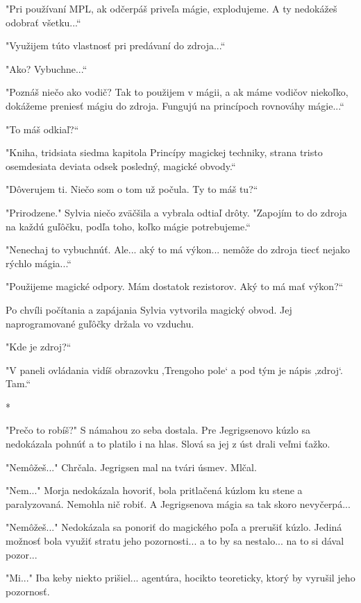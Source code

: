 \documentclass{book}
\begin{document}
"$ $Pri používaní MPL, ak odčerpáš priveľa mágie, explodujeme. A ty nedokážeš odobrať všetku...“

"$ $Využijem túto vlastnosť pri predávaní do zdroja...“

"$ $Ako? Vybuchne...“

"$ $Poznáš niečo ako vodič? Tak to použijem v mágii, a ak máme vodičov niekoľko, dokážeme preniesť mágiu do zdroja. Fungujú na princípoch rovnováhy mágie...“

"$ $To máš odkiaľ?“

"$ $Kniha, tridsiata siedma kapitola Princípy magickej techniky, strana tristo osemdesiata deviata odsek posledný, magické obvody.“

"$ $Dôverujem ti. Niečo som o tom už počula. Ty to máš tu?“

"$ $Prirodzene."$ $ Sylvia niečo zväčšila a vybrala odtiaľ drôty. "$ $Zapojím to do zdroja na každú guľôčku, podľa toho, koľko mágie potrebujeme.“

"$ $Nenechaj to vybuchnúť. Ale... aký to má výkon... nemôže do zdroja tiecť nejako rýchlo mágia...“

"$ $Použijeme magické odpory. Mám dostatok rezistorov. Aký to má mať výkon?“

Po chvíli počítania a zapájania Sylvia vytvorila magický obvod. Jej naprogramované guľôčky držala vo vzduchu.

"$ $Kde je zdroj?“

"$ $V paneli ovládania vidíš obrazovku ‚Trengoho pole‘ a pod tým je nápis ‚zdroj‘. Tam.“

\begin{center}

*

\end{center}

"$ $Prečo to robíš?"$ $ S námahou zo seba dostala. Pre Jegrigsenovo kúzlo sa nedokázala pohnúť a to platilo i na hlas. Slová sa jej z úst drali veľmi ťažko.

"$ $Nemôžeš..."$ $ Chrčala. Jegrigsen mal na tvári úsmev. Mlčal.

"$ $Nem..."$ $ Morja nedokázala hovoriť, bola pritlačená kúzlom ku stene a paralyzovaná. Nemohla nič robiť. A Jegrigsenova mágia sa tak skoro nevyčerpá...

"$ $Nemôžeš..."$ $ Nedokázala sa ponoriť do magického poľa a prerušiť kúzlo. Jediná možnosť bola využiť stratu jeho pozornosti... a to by sa nestalo... na to si dával pozor...

"$ $Mi..."$ $ Iba keby niekto prišiel... agentúra, hocikto teoreticky, ktorý by vyrušil jeho pozornosť.
\end{document}
